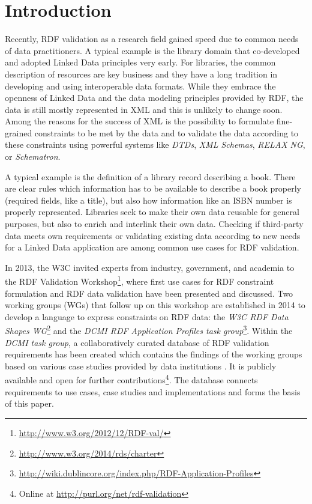 \documentclass{acm_proc_article-sp}
\begin{document}

\section{Introduction}
\label{introduction}

Recently, RDF validation as a research field gained speed due to common needs of data practitioners. A typical example is the library domain that co-developed and adopted Linked Data principles very early. For libraries, the common description of resources are key business and they have a long tradition in developing and using interoperable data formats. While they embrace the openness of Linked Data and the data modeling principles provided by RDF, the data is still mostly represented in XML and this is unlikely to change soon. 
Among the reasons for the success of XML is the possibility to formulate fine-grained constraints to be met by the data and to validate the data according to these constraints using powerful systems like \emph{DTDs}, \emph{XML Schemas}, \emph{RELAX NG}, or \emph{Schematron}.

A typical example is the definition of a library record describing a book. There are clear rules which information has to be available to describe a book properly (required fields, like a title), but also how information like an ISBN number is properly represented. Libraries seek to make their own data reusable for general purposes, but also to enrich and interlink their own data. Checking if third-party data meets own requirements or validating existing data according to new needs for a Linked Data application are among common use cases for RDF validation.

In 2013, the W3C invited experts from industry, government, and academia to the RDF Validation Workshop\footnote{\url{http://www.w3.org/2012/12/RDF-val/}}, 
where first use cases for RDF constraint formulation and RDF data validation have been presented and discussed. 
Two working groups (WGs) that follow up on this workshop are established in 2014 to develop a language to express constraints on RDF data: 
the \emph{W3C RDF Data Shapes WG}\footnote{\url{http://www.w3.org/2014/rds/charter}} and the \emph{DCMI RDF Application Profiles task group}\footnote{\url{http://wiki.dublincore.org/index.php/RDF-Application-Profiles}}. 
Within the \emph{DCMI task group}, a collaboratively curated database of RDF validation requirements has been created which contains the findings of the working groups based on various case studies provided by data institutions \cite{BoschEckert2014}. It is publicly available and open for further contributions\footnote{Online at \url{http://purl.org/net/rdf-validation}}.
The database connects requirements to use cases, case studies and implementations and forms the basis of this paper. 
\end{document}
